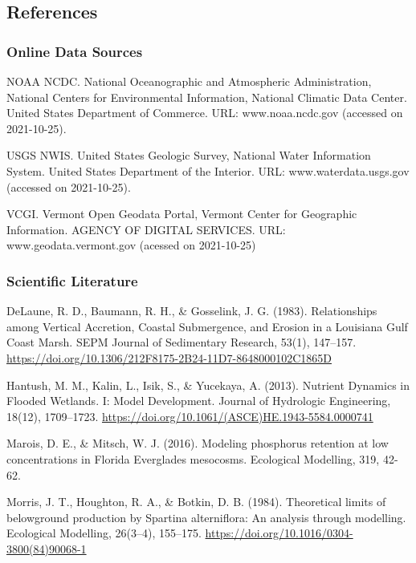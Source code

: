 \documentclass[
]{article}
\begin{document}
\hypertarget{references}{%
\subsection{References}\label{references}}

\hypertarget{online-data-sources}{%
\subsubsection{Online Data Sources}\label{online-data-sources}}

NOAA NCDC. National Oceanographic and Atmospheric Administration,
National Centers for Environmental Information, National Climatic Data
Center. United States Department of Commerce. URL: www.noaa.ncdc.gov
(accessed on 2021-10-25).

USGS NWIS. United States Geologic Survey, National Water Information
System. United States Department of the Interior. URL:
www.waterdata.usgs.gov (accessed on 2021-10-25).

VCGI. Vermont Open Geodata Portal, Vermont Center for Geographic
Information. AGENCY OF DIGITAL SERVICES. URL: www.geodata.vermont.gov
(acessed on 2021-10-25)

\hypertarget{scientific-literature}{%
\subsubsection{Scientific Literature}\label{scientific-literature}}

DeLaune, R. D., Baumann, R. H., \& Gosselink, J. G. (1983).
Relationships among Vertical Accretion, Coastal Submergence, and Erosion
in a Louisiana Gulf Coast Marsh. SEPM Journal of Sedimentary Research,
53(1), 147--157.
\url{https://doi.org/10.1306/212F8175-2B24-11D7-8648000102C1865D}

Hantush, M. M., Kalin, L., Isik, S., \& Yucekaya, A. (2013). Nutrient
Dynamics in Flooded Wetlands. I: Model Development. Journal of
Hydrologic Engineering, 18(12), 1709--1723.
\url{https://doi.org/10.1061/(ASCE)HE.1943-5584.0000741}

Marois, D. E., \& Mitsch, W. J. (2016). Modeling phosphorus retention at
low concentrations in Florida Everglades mesocosms. Ecological
Modelling, 319, 42-62.

Morris, J. T., Houghton, R. A., \& Botkin, D. B. (1984). Theoretical
limits of belowground production by Spartina alterniflora: An analysis
through modelling. Ecological Modelling, 26(3--4), 155--175.
\url{https://doi.org/10.1016/0304-3800(84)90068-1}
\end{document}
